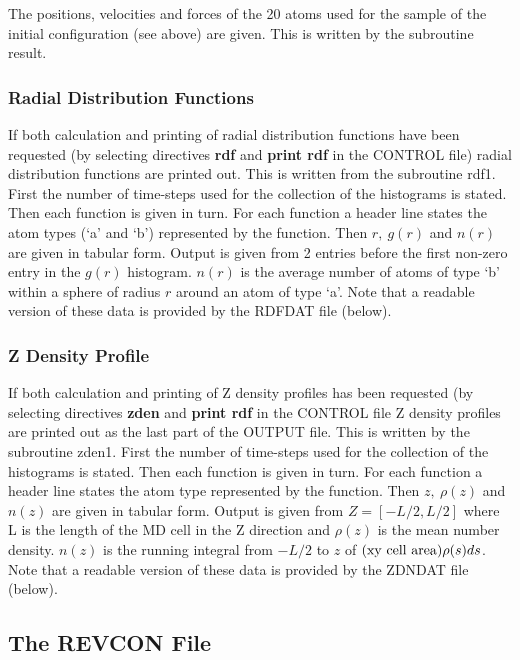 The positions, velocities and forces of the 20 atoms used for the
sample of the initial configuration (see above) are given. This is
written by the subroutine {\sc result}.
 
\subsubsection{Radial Distribution Functions}

If both calculation and printing of radial distribution functions have
been requested (by selecting directives {\bf rdf} and {\bf print rdf}
in the CONTROL file) radial distribution functions are printed out. 
This is written from the subroutine {\sc
rdf1}. First the number of time-steps used for the collection of the
histograms is stated.  Then each function is given in turn. For each
function a header line states the atom types (`a' and `b') represented
by the function. Then $r,~g(r)$ and $n(r)$ are given in tabular form.
Output is given from 2 entries before the first non-zero entry in the
$g(r)$ histogram.  $n(r)$ is the average number of atoms of type `b'
within a sphere of radius $r$ around an atom of type `a'.
Note that a readable version of these data is provided by the 
RDFDAT file (below). 

\subsubsection{ Z Density Profile}
If both calculation and printing of Z density profiles has been
requested (by selecting directives {\bf zden} and {\bf print rdf} in
the CONTROL file Z density profiles are printed out as the last part
of the OUTPUT file.  This is written by the subroutine {\sc zden1}.
First the number of time-steps used for the collection of the
histograms is stated.  Then each function is given in turn. For each
function a header line states the atom type represented by the
function.  Then $z,~\rho(z)$ and $n(z)$ are given in tabular form.
Output is given from $Z = [-L/2,L/2]$ where L is the length of the MD
cell in the Z direction and $\rho(z)$ is the mean number density.
$n(z)$ is the running integral from $-L/2$ to $z$ of $({\rm
xy~cell~area})\rho(s) ds$.
Note that a readable version of these data is provided by the 
ZDNDAT file (below). 

\subsection{The REVCON File}
\label{revconfile}

